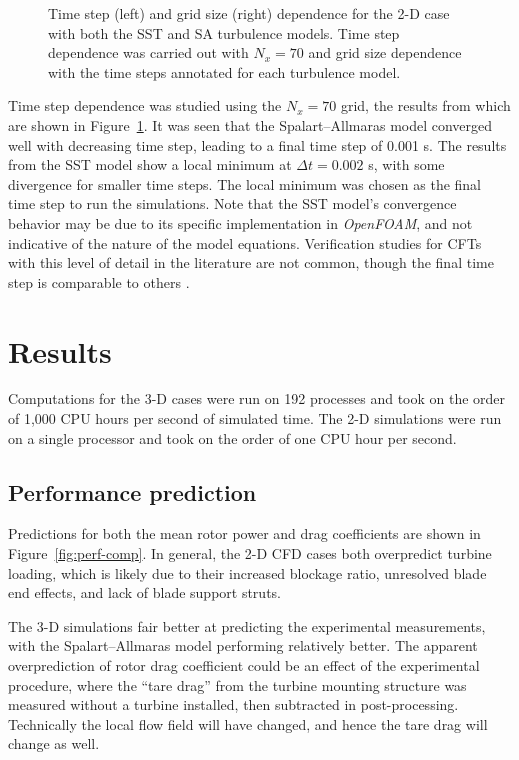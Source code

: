 \begin{figure}[ht]
    \centering


    \caption{Time step (left) and grid size (right) dependence for the 2-D case
        with both the SST and SA turbulence models. Time step dependence was carried
        out with $N_x=70$ and grid size dependence with the time steps annotated for
        each turbulence model.}

    \label{fig:verification}
\end{figure}

Time step dependence was studied using the $N_x=70$ grid, the results from which
are shown in Figure~\ref{fig:verification}. It was seen that the
Spalart--Allmaras model converged well with decreasing time step, leading to a
final time step of 0.001 s. The results from the SST model show a local minimum
at $\Delta t = 0.002$ s, with some divergence for smaller time steps. The local
minimum was chosen as the final time step to run the simulations. Note that the
SST model's convergence behavior may be due to its specific implementation in
\textit{OpenFOAM}, and not indicative of the nature of the model equations.
Verification studies for CFTs with this level of detail in the literature are
not common, though the final time step is comparable to others
\cite{Balduzzi2016}.


\section{Results}

Computations for the 3-D cases were run on 192 processes and took on the order
of 1,000 CPU hours per second of simulated time. The 2-D simulations were run on
a single processor and took on the order of one CPU hour per second.


\subsection{Performance prediction}

Predictions for both the mean rotor power and drag coefficients are shown in
Figure~\ref{fig:perf-comp}. In general, the 2-D CFD cases both overpredict
turbine loading, which is likely due to their increased blockage ratio,
unresolved blade end effects, and lack of blade support struts.

The 3-D simulations fair better at predicting the experimental measurements,
with the Spalart--Allmaras model performing relatively better. The apparent
overprediction of rotor drag coefficient could be an effect of the experimental
procedure, where the ``tare drag'' from the turbine mounting structure was
measured without a turbine installed, then subtracted in post-processing.
Technically the local flow field will have changed, and hence the tare drag will
change as well.

